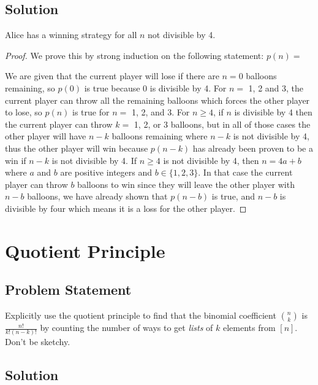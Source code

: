 \documentclass[12pt]{article}
\begin{document}
\subsection*{Solution}

Alice has a winning strategy for all $n$ not divisible by 4.

\begin{proof}
We prove this by strong induction on the following statement: $p(n)=$ 

We are given that the current player will lose if there are $n=0$ balloons remaining, so $p(0)$ is true because 0 is divisible by 4. For $n=$ 1, 2 and 3, the current player can throw all the remaining balloons which forces the other player to lose, so $p(n)$ is true for $n=$ 1, 2, and 3. For $n \geq 4$, if $n$ is divisible by 4 then the current player can throw $k=$ 1, 2, or 3 balloons, but in all of those cases the other player will have $n-k$ balloons remaining where $n-k$ is not divisible by 4, thus the other player will win because $p(n-k)$ has already been proven to be a win if $n-k$ is not divisible by 4. If $n \geq 4$ is not divisible by 4, then $n = 4a + b$ where $a$ and $b$ are positive integers and $b \in \{1,2,3\}$. In that case the current player can throw $b$ balloons to win since they will leave the other player with $n-b$ balloons, we have already shown that $p(n-b)$ is true, and $n-b$ is divisible by four which means it is a loss for the other player.
\end{proof}


\section{Quotient Principle}
\subsection*{Problem Statement}
Explicitly use the quotient principle to find that the binomial coefficient $\binom{n}{k}$ is $\frac{n!}{k!(n-k)!}$ by counting the number of ways to get \emph{lists} of $k$ elements from $[n]$. Don't be sketchy.
\subsection*{Solution}
\end{document}
